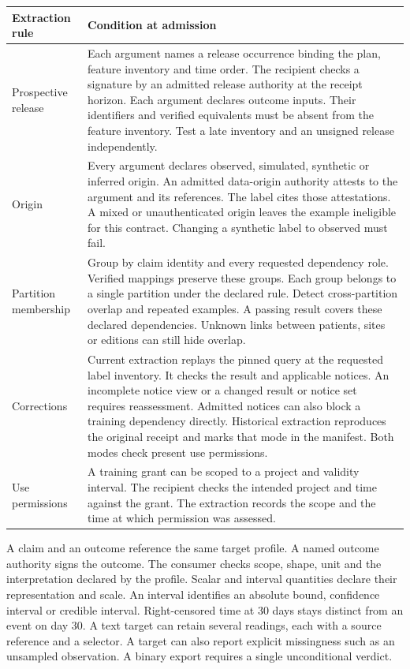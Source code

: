 \documentclass[11pt,a4paper]{article}
\newcommand{\topic}[1]{\par\smallskip{\sffamily\bfseries\color{ink}#1\par}\nobreak}
\begin{document}
\small
\begin{tabularx}{\linewidth}{@{}L{.20\linewidth}Y@{}}
\toprule
\textbf{Extraction rule} & \textbf{Condition at admission} \\ \midrule
Prospective release & Each argument names a release occurrence binding the plan, feature inventory and time order. The recipient checks a signature by an admitted release authority at the receipt horizon. Each argument declares outcome inputs. Their identifiers and verified equivalents must be absent from the feature inventory. Test a late inventory and an unsigned release independently. \\
Origin & Every argument declares observed, simulated, synthetic or inferred origin. An admitted data-origin authority attests to the argument and its references. The label cites those attestations. A mixed or unauthenticated origin leaves the example ineligible for this contract. Changing a synthetic label to observed must fail. \\
Partition membership & Group by claim identity and every requested dependency role. Verified mappings preserve these groups. Each group belongs to a single partition under the declared rule. Detect cross-partition overlap and repeated examples. A passing result covers these declared dependencies. Unknown links between patients, sites or editions can still hide overlap. \\
Corrections & Current extraction replays the pinned query at the requested label inventory. It checks the result and applicable notices. An incomplete notice view or a changed result or notice set requires reassessment. Admitted notices can also block a training dependency directly. Historical extraction reproduces the original receipt and marks that mode in the manifest. Both modes check present use permissions. \\
Use permissions & A training grant can be scoped to a project and validity interval. The recipient checks the intended project and time against the grant. The extraction records the scope and the time at which permission was assessed. \\
\bottomrule
\end{tabularx}
\normalsize

\topic{Typed targets}
A claim and an outcome reference the same target profile. A named outcome authority signs the outcome. The consumer checks scope, shape, unit and the interpretation declared by the profile. Scalar and interval quantities declare their representation and scale. An interval identifies an absolute bound, confidence interval or credible interval. Right-censored time at 30 days stays distinct from an event on day 30. A text target can retain several readings, each with a source reference and a selector. A target can also report explicit missingness such as an unsampled observation. A binary export requires a single unconditional verdict.
\end{document}
